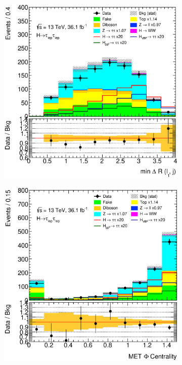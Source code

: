 \begin{figure}[htb]
\begin{subfigure}[t]{0.3\textwidth}
    \end{subfigure}
    \begin{subfigure}[t]{0.3\textwidth}
        \includegraphics[width=\textwidth]{./plots/mva/modeling/input_vars/VBF_DF/ll-CutMVAVBFCatDF-dRminLep0Jet-lin.eps}
    \end{subfigure}
    \begin{subfigure}[t]{0.3\textwidth}
        \includegraphics[width=\textwidth]{./plots/mva/modeling/input_vars/VBF_DF/ll-CutMVAVBFCatDF-METPhiCentrality2-lin.eps}

\end{subfigure}
\end{figure}
